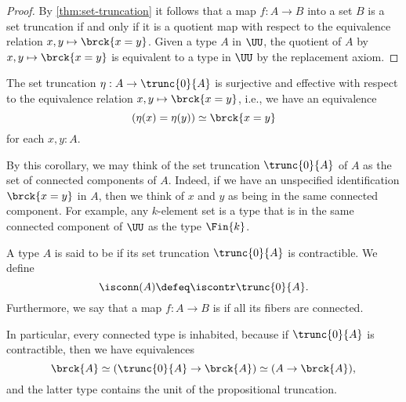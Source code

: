 \begin{proof}
  By \cref{thm:set-truncation} it follows that a map $f:A\to B$ into a set $B$ is a set truncation if and only if it is a quotient map with respect to the equivalence relation $x,y\mapsto\brck{x=y}$. Given a type $A$ in $\UU$, the quotient of $A$ by $x,y\mapsto\brck{x=y}$ is equivalent to a type in $\UU$ by the replacement axiom.
\end{proof}

\begin{cor}
  The set truncation $\eta:A\to\trunc{0}{A}$ is surjective and effective with respect to the equivalence relation $x,y\mapsto\brck{x=y}$, i.e., we have an equivalence
  \begin{equation*}
    (\eta(x)=\eta(y))\simeq \brck{x=y}
  \end{equation*}
  for each $x,y:A$. 
\end{cor}

By this corollary, we may think of the set truncation $\trunc{0}{A}$ of $A$ as the set of connected components of $A$. Indeed, if we have an unspecified identification $\brck{x=y}$ in $A$, then we think of $x$ and $y$ as being in the same connected component. For example, any $k$-element set is a type that is in the same connected component of $\UU$ as the type $\Fin{k}$.

\begin{defn}
  A type $A$ is said to be  if its set truncation $\trunc{0}{A}$ is contractible. We define
  \begin{equation*}
    \isconn(A)\defeq\iscontr\trunc{0}{A}.
  \end{equation*}
  Furthermore, we say that a map $f:A\to B$ is  if all its fibers are connected.
\end{defn}

\begin{rmk}
  In particular, every connected type is inhabited, because if $\trunc{0}{A}$ is contractible, then we have equivalences
  \begin{equation*}
    \brck{A}\simeq (\trunc{0}{A}\to\brck{A}) \simeq (A\to \brck{A}),
  \end{equation*}
  and the latter type contains the unit of the propositional truncation.
\end{rmk}

